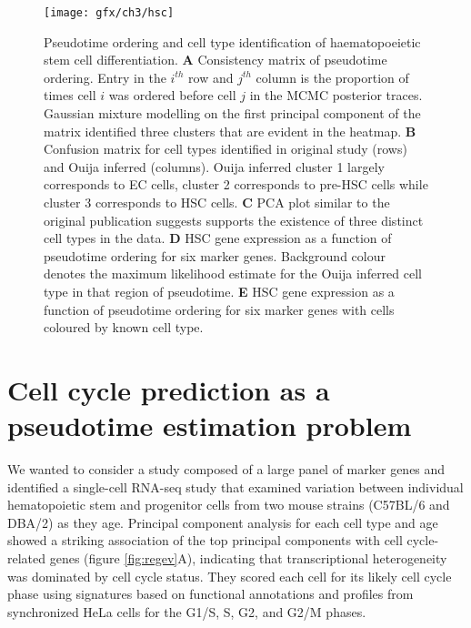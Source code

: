 \begin{figure}
	\centering
	\texttt{[image: gfx/ch3/hsc]}
	\caption[Pseudotime ordering and cell type identification of haematopoeietic stem cell differentiation.]{Pseudotime ordering and cell type identification of haematopoeietic stem cell differentiation.
\textbf{A} Consistency matrix of pseudotime ordering. Entry in the $i^{th}$ row and $j^{th}$ column is the proportion of times cell $i$ was ordered before cell $j$ in the MCMC posterior traces. Gaussian mixture modelling on the first principal component of the matrix identified three clusters that are evident in the heatmap.
\textbf{B} Confusion matrix for cell types identified in original study (rows) and Ouija inferred (columns). Ouija inferred cluster 1 largely corresponds to EC cells, cluster 2 corresponds to pre-HSC cells while cluster 3 corresponds to HSC cells.
\textbf{C} PCA plot similar to the original publication \cite{zhou2016tracing} suggests supports the existence of three distinct cell types in the data.
\textbf{D} HSC gene expression as a function of pseudotime ordering for six marker genes. Background colour denotes the maximum likelihood estimate for the Ouija inferred cell type in that region of pseudotime.
\textbf{E} HSC gene expression as a function of pseudotime ordering for six marker genes with cells coloured by known cell type.
}
	\label{fig:hsc}
\end{figure}


\section{Cell cycle prediction as a pseudotime estimation problem}

We wanted to consider a study composed of a large panel of marker genes and identified a single-cell RNA-seq study \cite{Kowalczyk2015-li} that examined variation between individual hematopoietic stem and progenitor cells from two mouse strains (C57BL/6 and DBA/2) as they age. Principal component analysis for each cell type and age showed a striking association of the top principal components with cell cycle-related genes (figure \ref{fig:regev}A), indicating that transcriptional heterogeneity was dominated by cell cycle status. They scored each cell for its likely cell cycle phase using signatures based on functional annotations \cite{reference2009gene} and profiles from synchronized HeLa cells \cite{whitfield2002identification} for the G1/S, S, G2, and G2/M phases.

